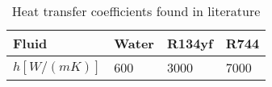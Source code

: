 \begin{table}[h!]
\centering
\caption{Heat transfer coefficients found in literature}\vspace{2mm}
\label{tab:alphas} 
\begin{tabular}{llll}
	\toprule
	Fluid             & Water & R134yf & R744 \\ \midrule
	$h [W/(mK)]$ & 600   & 3000   & 7000 \\ \bottomrule
\end{tabular}
\end{table}